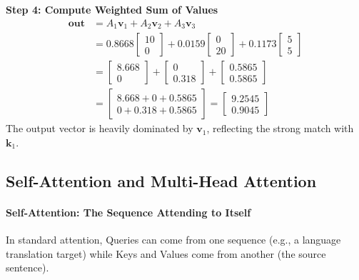\begin{example}
\textbf{Step 4: Compute Weighted Sum of Values}
\begin{align*}
\mathbf{out} &= A_1 \mathbf{v}_1 + A_2 \mathbf{v}_2 + A_3 \mathbf{v}_3 \\
             &= 0.8668 \begin{bmatrix} 10 \\ 0 \end{bmatrix} + 0.0159 \begin{bmatrix} 0 \\ 20 \end{bmatrix} + 0.1173 \begin{bmatrix} 5 \\ 5 \end{bmatrix} \\
             &= \begin{bmatrix} 8.668 \\ 0 \end{bmatrix} + \begin{bmatrix} 0 \\ 0.318 \end{bmatrix} + \begin{bmatrix} 0.5865 \\ 0.5865 \end{bmatrix} \\
             &= \begin{bmatrix} 8.668 + 0 + 0.5865 \\ 0 + 0.318 + 0.5865 \end{bmatrix} = \begin{bmatrix} \mathbf{9.2545} \\ \mathbf{0.9045} \end{bmatrix}
\end{align*}
The output vector is heavily dominated by $\mathbf{v}_1$, reflecting the strong match with $\mathbf{k}_1$.
\end{example}

\subsection{Self-Attention and Multi-Head Attention}\label{subsec:self_multihead}

\paragraph{Self-Attention: The Sequence Attending to Itself}
In standard attention, Queries can come from one sequence (e.g., a language translation target) while Keys and Values come from another (the source sentence). 

